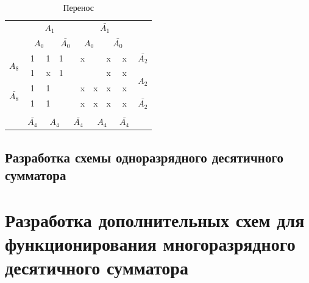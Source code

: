 \documentclass[a4paper,14pt]{article}
\begin{document}
\begin{table}[H]
	\begin{center}
		\caption{Перенос}
		\begin{tabular}{cccccccccc}
			& \multicolumn{4}{c}{$A_1$} & \multicolumn{4}{c}{$\bar{A_1}$} &  \\
			& \multicolumn{2}{c}{$A_0$} & \multicolumn{2}{c}{$\bar{A_0}$} & \multicolumn{2}{c}{$A_0$} & \multicolumn{2}{c}{$\bar{A_0}$} &  \\ \cline{2-9}
			\multicolumn{1}{c|}{\multirow{2}{*}{$A_8$}} & \multicolumn{1}{c|}{1} & \multicolumn{1}{c|}{1} & \multicolumn{1}{c|}{1} & \multicolumn{1}{c|}{} & \multicolumn{1}{c|}{x} & \multicolumn{1}{c|}{} & \multicolumn{1}{c|}{x} & \multicolumn{1}{c|}{x} & $\bar{A_2}$ \\ \cline{2-9}
			\multicolumn{1}{c|}{} & \multicolumn{1}{c|}{1} & \multicolumn{1}{c|}{x} & \multicolumn{1}{c|}{1} & \multicolumn{1}{c|}{} & \multicolumn{1}{c|}{} & \multicolumn{1}{c|}{} & \multicolumn{1}{c|}{x} & \multicolumn{1}{c|}{x} & \multirow{2}{*}{$A_2$} \\ \cline{2-9}
			\multicolumn{1}{c|}{\multirow{2}{*}{$\bar{A_8}$}} & \multicolumn{1}{c|}{1} & \multicolumn{1}{c|}{1} & \multicolumn{1}{c|}{} & \multicolumn{1}{c|}{} & \multicolumn{1}{c|}{x} & \multicolumn{1}{c|}{x} & \multicolumn{1}{c|}{x} & \multicolumn{1}{c|}{x} &  \\ \cline{2-9}
			\multicolumn{1}{c|}{} & \multicolumn{1}{c|}{1} & \multicolumn{1}{c|}{1} & \multicolumn{1}{c|}{} & \multicolumn{1}{c|}{} & \multicolumn{1}{c|}{x} & \multicolumn{1}{c|}{x} & \multicolumn{1}{c|}{x} & \multicolumn{1}{c|}{x} & $\bar{A_2}$ \\ \cline{2-9}
			\\
			& $\bar{A_4}$ & \multicolumn{2}{c}{$A_4$} & \multicolumn{2}{c}{$\bar{A_4}$} & \multicolumn{2}{c}{$A_4$} & $\bar{A_4}$ & 
		\end{tabular}
	\end{center}
\end{table}




\subsection{Разработка схемы одноразрядного десятичного сумматора}

\section{Разработка дополнительных схем для функционирования многоразрядного десятичного сумматора}
\end{document}
